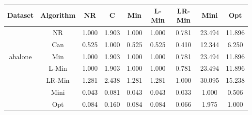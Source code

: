 \documentclass[11pt]{book}
\begin{document}
\begin{table}

	\centering
	
\begin{tabular}{|c|c|c|c|c|c|c|c|c|}

    \hline
    Dataset &
    	Algorithm &
    	NR &
    	C &
    	Min &
    	L-Min &
    	LR-Min &
    	Mini &
    	Opt \\
    	    
    \hline
    \multirow{5}{*}{abalone}
         & NR & 1.000 & 1.903 & 1.000 & 1.000 & 0.781 & 23.494 & 11.896 \\                                                                                                                                           
         & Can & 0.525 & 1.000 & 0.525 & 0.525 & 0.410 & 12.344 & 6.250 \\                                                                                                                                           
         & Min & 1.000 & 1.903 & 1.000 & 1.000 & 0.781 & 23.494 & 11.896 \\                                                                                                                                          
         & L-Min & 1.000 & 1.903 & 1.000 & 1.000 & 0.781 & 23.494 & 11.896 \\                                                                                                                                        
         & LR-Min & 1.281 & 2.438 & 1.281 & 1.281 & 1.000 & 30.095 & 15.238 \\                                                                                                                                       
         & Mini & 0.043 & 0.081 & 0.043 & 0.043 & 0.033 & 1.000 & 0.506 \\                                                                                                                                           
         & Opt & 0.084 & 0.160 & 0.084 & 0.084 & 0.066 & 1.975 & 1.000 \\ 
    	

\end{tabular}
\end{table}
\end{document}
